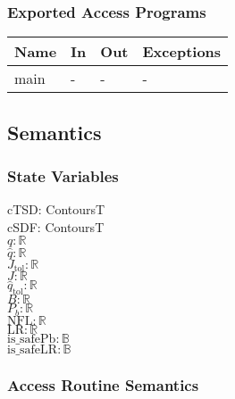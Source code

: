 \documentclass[12pt, titlepage]{article}
\begin{document}
\subsubsection{Exported Access Programs}

\begin{center}
\begin{tabular}{p{2cm} p{4cm} p{4cm} p{2cm}}
\hline
\textbf{Name} & \textbf{In} & \textbf{Out} & \textbf{Exceptions} \\
\hline
main & - & - & - \\
\hline
\end{tabular}
\end{center}

\subsection{Semantics}

\subsubsection{State Variables}

cTSD: ContoursT\\
cSDF: ContoursT\\
$q: \mathbb{R}$\\
$\hat{q}: \mathbb{R}$\\
$J_\text{tol}: \mathbb{R}$\\
$J: \mathbb{R}$\\
$\hat{q}_\text{tol}: \mathbb{R}$\\
$B: \mathbb{R}$\\
$P_b: \mathbb{R}$\\
$\text{NFL}: \mathbb{R}$\\
$\text{LR}: \mathbb{R}$\\
$\text{is\_safePb}: \mathbb{B}$\\
$\text{is\_safeLR}: \mathbb{B}$

\subsubsection{Access Routine Semantics}
\end{document}
